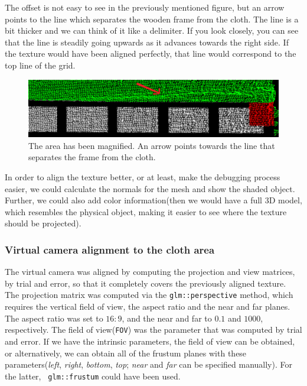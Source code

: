 \documentclass[]{article}
\begin{document}
The offset is not easy to see in the previously mentioned figure, but an arrow points to the line which separates the wooden frame from the cloth. The line is a bit thicker and we can think of it like a delimiter. If you look closely, you can see that the line is steadily going upwards as it advances towards the right side. If the texture would have been aligned perfectly, that line would correspond to the top line of the grid.



\begin{figure}[!hbtp]
    \centering
    \includegraphics[width=1.0\textwidth]{figures/MisalignmentArea3.png}
    \caption{The area has been magnified. An arrow points towards the line that separates the frame from the cloth.}
    \label{fig:MisalignmentArea}
\end{figure}

In order to align the texture better, or at least, make the debugging process easier, we could calculate the normals for the mesh and show the shaded object. Further, we could also add color information(then we would have a full 3D model, which resembles the physical object, making it easier to see where the texture should be projected).

\subsubsection{Virtual camera alignment to the cloth area}

The virtual camera was aligned by computing the projection and view matrices, by trial and error, so that it completely covers the previously aligned texture. The projection matrix was computed via the \verb|glm::perspective| method, which requires the vertical field of view, the aspect ratio and the near and far planes. The aspect ratio was set to $16:9$, and the near and far to $0.1$ and $1000$, respectively. The field of view(\verb|FOV|) was the parameter that was computed by trial and error. If we have the intrinsic parameters, the field of view can be obtained, or alternatively, we can obtain all of the frustum planes with these parameters(\textit{left}, \textit{right}, \textit{bottom}, \textit{top}; \textit{near} and \textit{far} can be specified manually). For the latter, \verb| glm::frustum| could have been used.
\end{document}
